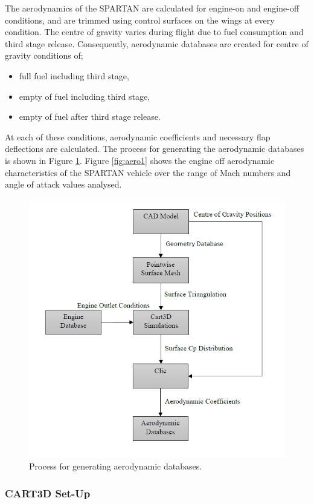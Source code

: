 		The aerodynamics of the SPARTAN are calculated for engine-on and engine-off conditions, and are trimmed using control surfaces on the wings at every condition. The centre of gravity varies during flight due to fuel consumption and third stage release. Consequently, aerodynamic databases are created for centre of gravity conditions of; 
		\begin{itemize}
			\item full fuel including third stage,
			\item empty of fuel including third stage,
			\item empty of fuel after third stage release.
		\end{itemize}
		At each of these conditions, aerodynamic coefficients and necessary flap deflections are calculated. 
		The process for generating the aerodynamic databases is shown in Figure \ref{fig:FlowChart}. 
		Figure \ref{fig:aero1} shows the engine off aerodynamic characteristics of the SPARTAN vehicle over the range of Mach numbers and angle of attack values analysed.
		
			\begin{figure}
				\centering
				\includegraphics[width=0.7\linewidth]{figures/3_vehicle_design/FlowChart}
				\caption{Process for generating aerodynamic databases.}
				\label{fig:FlowChart}
			\end{figure}
		
		
		
		\subsubsection{CART3D Set-Up}
		
